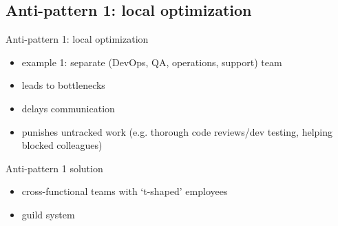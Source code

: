 \documentclass{beamer}
\begin{document}
	\subsection{Anti-pattern 1: local optimization}
	\begin{frame}{Anti-pattern 1: local optimization}
		\begin{itemize}
			\item example 1: separate (DevOps, QA, operations, support) team \pause
			\item leads to bottlenecks \pause
			\item delays communication \pause
			\item punishes untracked work (e.g. thorough code reviews/dev testing, helping blocked colleagues)
		\end{itemize}
	\end{frame}
	\begin{frame}{Anti-pattern 1 solution}
		\begin{itemize}
			\item cross-functional teams with `t-shaped' employees \pause
			\item guild system 
		\end{itemize}
	\end{frame}
\end{document}
